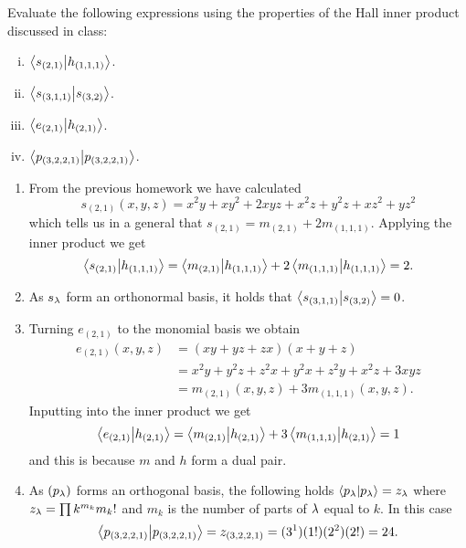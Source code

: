\documentclass[12pt]{memoir}
\begin{document}
\begin{Ej}[Exercise 1]
    Evaluate the following expressions using the properties of the Hall inner product discussed in class:\vspace{-0.4em}
    \begin{enumerate}[i)]
        \itemsep=-0.4em
        \item $\braket{s_{(2,1)}}{h_{(1,1,1)}}$.
        \item $\braket{s_{(3,1,1)}}{s_{(3,2)}}$.
        \item $\braket{e_{(2,1)}}{h_{(2,1)}}$.
        \item $\braket{p_{(3,2,2,1)}}{p_{(3,2,2,1)}}$.
    \end{enumerate}
\end{Ej}

\begin{ptcbr}
    \begin{enumerate}
        \item From the previous homework we have calculated 
        $$s_{(2,1)}(x,y,z)=x^2y+xy^2+2xyz+x^2z+y^2z+xz^2+yz^2$$
        which tells us in a general that $s_{(2,1)}=m_{(2,1)}+2m_{(1,1,1)}$. Applying the inner product we get
        $$\braket{s_{(2,1)}}{h_{(1,1,1)}}=\braket{m_{(2,1)}}{h_{(1,1,1)}}+2\braket{m_{(1,1,1)}} {h_{(1,1,1)}}=2.$$
        \item As $s_\lambda$ form an orthonormal basis, it holds that $\braket{s_{(3,1,1)}}{s_{(3,2)}}=0$.
        \item Turning $e_{(2,1)}$ to the monomial basis we obtain 
        \begin{align*}
            e_{(2,1)}(x,y,z)&=(xy+yz+zx)(x+y+z)\\
            &=x^2y+y^2z+z^2x+y^2x+z^2y+x^2z+3xyz\\
        &=m_{(2,1)}(x,y,z)+3m_{(1,1,1)}(x,y,z).
        \end{align*}
        Inputting into the inner product we get 
        $$\braket{e_{(2,1)}}{h_{(2,1)}}=\braket{m_{(2,1)}}{h_{(2,1)}}+3\braket{m_{(1,1,1)}}{h_{(2,1)}}=1$$
        and this is because $m$ and $h$ form a dual pair.
        \item As $(p_\lambda)$ forms an orthogonal basis, the following holds $\braket{p_\lambda}{p_\lambda}=z_\lambda$ where $z_\lambda=\prod k^{m_k}m_k!$ and $m_k$ is the number of parts of $\lambda$ equal to $k$. In this case 
        $$\braket{p_{(3,2,2,1)}}{p_{(3,2,2,1)}}=z_{(3,2,2,1)}=(3^1)(1!)(2^2)(2!)=24.$$
    \end{enumerate}
\end{ptcbr}
\end{document}

